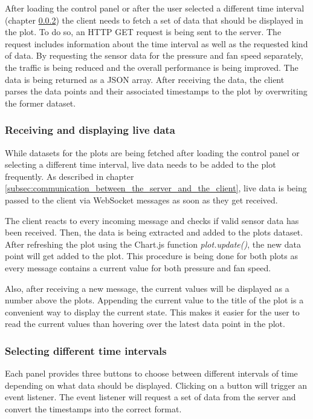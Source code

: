 After loading the control panel or after the user selected a different time interval (chapter \ref{subsec:selecting_different_time_intervals}) the client needs to fetch a set of data that should be displayed in the plot. To do so, an HTTP GET request is being sent to the server. The request includes information about the time interval as well as the requested kind of data. By requesting the sensor data for the pressure and fan speed separately, the traffic is being reduced and the overall performance is being improved. The data is being returned as a JSON array. After receiving the data, the client parses the data points and their associated timestamps to the plot by overwriting the former dataset.


\subsubsection{Receiving and displaying live data}
\label{subsec:receiving_and_displaying_live_data}

While datasets for the plots are being fetched after loading the control panel or selecting a different time interval, live data needs to be added to the plot frequently. As described in chapter \ref{subsec:communication_between_the_server_and_the_client},  live data is being passed to the client via WebSocket messages as soon as they get received. 

The client reacts to every incoming message and checks if valid sensor data has been received. Then, the data is being extracted and added to the plots dataset. After refreshing the plot using the Chart.js function \textit{plot.update()}, the new data point will get added to the plot. This procedure is being done for both plots as every message contains a current value for both pressure and fan speed. 

Also, after receiving a new message, the current values will be displayed as a number above the plots. Appending the current value to the title of the plot is a convenient way to display the current state. This makes it easier for the user to read the current values than hovering over the latest data point in the plot.


\subsubsection{Selecting different time intervals}
\label{subsec:selecting_different_time_intervals}

Each panel provides three buttons to choose between different intervals of time depending on what data should be displayed. Clicking on a button will trigger an event listener. The event listener will request a set of data from the server and convert the timestamps into the correct format.

